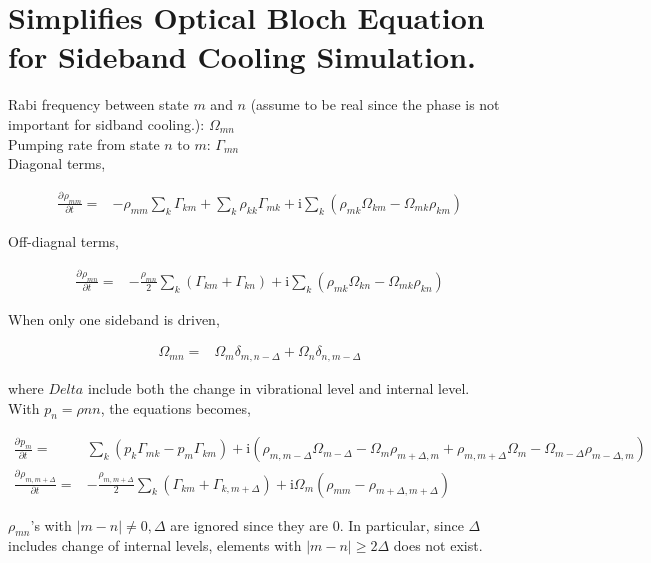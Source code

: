 \documentclass[10pt,fleqn]{article}
\newcommand{\ui}{\mathrm{i}}
\newcommand{\eqar}[1]
{
  \begin{align*}
    #1
  \end{align*}
}
\newcommand{\paren}[1]{{\left({#1}\right)}}
\newcommand{\abs}[1]{{\left|{#1}\right|}}
\newcommand{\pdiff}[3][{}]{{\frac{\partial^{#1} {#2}}{\partial {#3}{}^{#1}}}}
\begin{document}
\section{Simplifies Optical Bloch Equation for Sideband Cooling Simulation.}
Rabi frequency between state $m$ and $n$ (assume to be real since the phase is not important for sidband cooling.): $\Omega_{mn}$\\
Pumping rate from state $n$ to $m$: $\Gamma_{mn}$\\

Diagonal terms,
\eqar{
  \pdiff{\rho_{mm}}{t}=&-\rho_{mm}\sum_k\Gamma_{km}+\sum_k\rho_{kk}\Gamma_{mk}+\ui\sum_k\paren{\rho_{mk}\Omega_{km}-\Omega_{mk}\rho_{km}}
}
Off-diagnal terms,
\eqar{
  \pdiff{\rho_{mn}}{t}=&-\frac{\rho_{mn}}{2}\sum_k\paren{\Gamma_{km}+\Gamma_{kn}}+\ui\sum_k\paren{\rho_{mk}\Omega_{kn}-\Omega_{mk}\rho_{kn}}
}

When only one sideband is driven,
\eqar{
  \Omega_{mn}=&\Omega_{m}\delta_{m,n-\Delta}+\Omega_{n}\delta_{n,m-\Delta}
}
where $Delta$ include both the change in vibrational level and internal level.\\
With $p_n=\rho{nn}$, the equations becomes,
\eqar{
  \pdiff{p_{m}}{t}=&\sum_k\paren{p_{k}\Gamma_{mk}-p_{m}\Gamma_{km}}+\ui\paren{\rho_{m,m-\Delta}\Omega_{m-\Delta}-\Omega_{m}\rho_{m+\Delta, m}+\rho_{m,m+\Delta}\Omega_{m}-\Omega_{m-\Delta}\rho_{m-\Delta,m}}\\
  \pdiff{\rho_{m,m+\Delta}}{t}=&-\frac{\rho_{m,m+\Delta}}{2}\sum_k\paren{\Gamma_{km}+\Gamma_{k,m+\Delta}}+\ui\Omega_{m}\paren{\rho_{mm}-\rho_{m+\Delta,m+\Delta}}
}
$\rho_{mn}$'s with $\abs{m-n}\neq0,\Delta$ are ignored since they are $0$. In particular, since $\Delta$ includes change of internal levels, elements with $\abs{m-n}\geqslant2\Delta$ does not exist.
\end{document}
